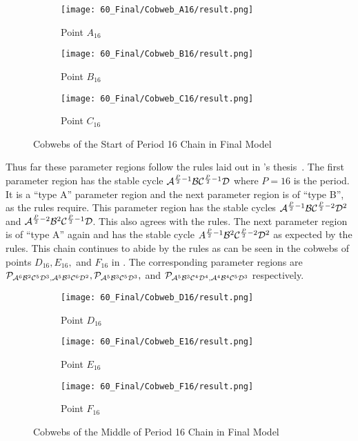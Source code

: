 \begin{figure}
    \centering
    \begin{subfigure}{0.3\textwidth}
        \centering
        \texttt{[image: 60\_Final/Cobweb\_A16/result.png]}
        \caption{Point $A_{16}$}
        \label{fig:final.cob.A16}
    \end{subfigure}
    \begin{subfigure}{0.3\textwidth}
        \centering
        \texttt{[image: 60\_Final/Cobweb\_B16/result.png]}
        \caption{Point $B_{16}$}
        \label{fig:final.cob.B16}
    \end{subfigure}
    \begin{subfigure}{0.3\textwidth}
        \centering
        \texttt{[image: 60\_Final/Cobweb\_C16/result.png]}
        \caption{Point $C_{16}$}
        \label{fig:final.cob.C16}
    \end{subfigure}
    \caption{Cobwebs of the Start of Period 16 Chain in Final Model}
    \label{fig:final.cob.start16}
\end{figure}

Thus far these parameter regions follow the rules laid out in 's thesis~\Cite{akyuz2022}.
The first parameter region has the stable cycle $\mathcal{A}^{\frac{P}{2} - 1}\mathcal{B}\mathcal{C}^{\frac{P}{2} - 1}\mathcal{D}$ where $P = 16$ is the period.
It is a ``type A'' parameter region and the next parameter region is of ``type B'', as the rules require.
This parameter region has the stable cycles $\mathcal{A}^{\frac{P}{2} - 1}\mathcal{B}\mathcal{C}^{\frac{P}{2} - 2}\mathcal{D}^2$ and $\mathcal{A}^{\frac{P}{2} - 2}\mathcal{B}^2\mathcal{C}^{\frac{P}{2} - 1}\mathcal{D}$.
This also agrees with the rules.
The next parameter region is of ``type A'' again and has the stable cycle $A^{\frac{P}{2} - 1}\mathcal{B}^2\mathcal{C}^{\frac{P}{2} - 2}\mathcal{D}^2$ as expected by the rules.
This chain continues to abide by the rules as can be seen in the cobwebs of points $D_{16}, E_{16},$ and $F_{16}$ in .
The corresponding parameter regions are $\mathcal{P}_{\mathcal{A}^6\mathcal{B}^2\mathcal{C}^5\mathcal{D}^3, \mathcal{A}^5\mathcal{B}^3\mathcal{C}^6\mathcal{D}^2}, \mathcal{P}_{\mathcal{A}^5\mathcal{B}^3\mathcal{C}^5\mathcal{D}^3},$ and $\mathcal{P}_{\mathcal{A}^5\mathcal{B}^3\mathcal{C}^4\mathcal{D}^4, \mathcal{A}^4\mathcal{B}^4\mathcal{C}^5\mathcal{D}^3}$ respectively.

\begin{figure}
    \centering
    \begin{subfigure}{0.3\textwidth}
        \centering
        \texttt{[image: 60\_Final/Cobweb\_D16/result.png]}
        \caption{Point $D_{16}$}
        \label{fig:final.cob.D16}
    \end{subfigure}
    \begin{subfigure}{0.3\textwidth}
        \centering
        \texttt{[image: 60\_Final/Cobweb\_E16/result.png]}
        \caption{Point $E_{16}$}
        \label{fig:final.cob.E16}
    \end{subfigure}
    \begin{subfigure}{0.3\textwidth}
        \centering
        \texttt{[image: 60\_Final/Cobweb\_F16/result.png]}
        \caption{Point $F_{16}$}
        \label{fig:final.cob.F16}
    \end{subfigure}
    \caption{Cobwebs of the Middle of Period 16 Chain in Final Model}
    \label{fig:final.cob.mid16}
\end{figure}

